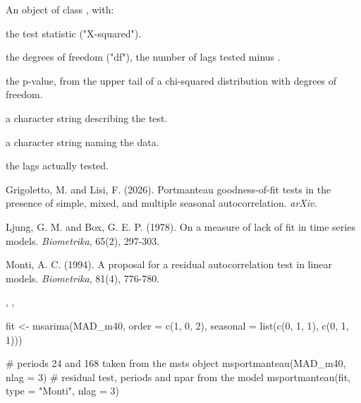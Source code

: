 \documentclass[a4paper]{book}
\begin{document}
\begin{Value}
An object of class , with:
\begin{ldescription}
\item[\code{statistic}] the test statistic ("X-squared").
\item[\code{parameter}] the degrees of freedom ("df"), the number of lags tested
minus .
\item[\code{p.value}] the p-value, from the upper tail of a chi-squared
distribution with  degrees of freedom.
\item[\code{method}] a character string describing the test.
\item[\code{data.name}] a character string naming the data.
\item[\code{lag}] the lags actually tested.
\end{ldescription}
\end{Value}
%
\begin{References}
Grigoletto, M. and Lisi, F. (2026). Portmanteau goodness-of-fit tests in the
presence of simple, mixed, and multiple seasonal autocorrelation. \emph{arXiv}.

Ljung, G. M. and Box, G. E. P. (1978). On a measure of lack of fit in time
series models. \emph{Biometrika}, 65(2), 297-303.

Monti, A. C. (1994). A proposal for a residual autocorrelation test in
linear models. \emph{Biometrika}, 81(4), 776-780.
\end{References}
%
\begin{SeeAlso}
, , 
\end{SeeAlso}
%
\begin{Examples}
\begin{ExampleCode}
fit <- msarima(MAD_m40, order = c(1, 0, 2),
               seasonal = list(c(0, 1, 1), c(0, 1, 1)))

# periods 24 and 168 taken from the msts object
msportmanteau(MAD_m40, nlag = 3)
# residual test, periods and npar from the model
msportmanteau(fit, type = "Monti", nlag = 3)

\end{ExampleCode}
\end{Examples}
%
\end{document}
